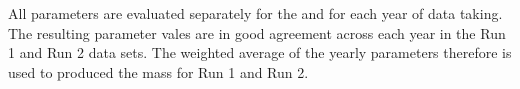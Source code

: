 All parameters are evaluated separately for the \bd and \bs for each year of data taking. The resulting parameter vales are in good agreement across each year in the Run 1 and Run 2 data sets. The weighted average of the yearly parameters therefore is used to produced the mass \pdfs for Run 1 and Run 2.%


